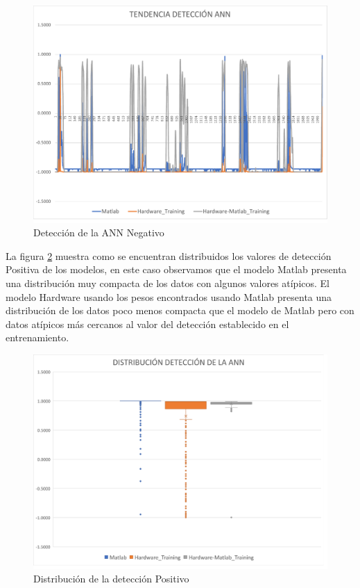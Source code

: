 \begin{figure}[H]
	\centering
		\includegraphics[scale=0.6]{./Figures/TendenciaANN2}
	\caption{Detección de la ANN Negativo}
	\label{fig:TendN}
\end{figure}

 La figura \ref{fig:DistP} muestra como se encuentran distribuidos los valores de detección Positiva de los modelos, en este caso observamos que el modelo Matlab presenta una distribución muy compacta de los datos con algunos valores atípicos. El modelo Hardware usando los pesos encontrados usando Matlab presenta una distribución de los datos poco menos compacta que el modelo de Matlab pero con datos atípicos más cercanos al valor del detección establecido en el entrenamiento.

\begin{figure}[H]
	\centering
		\includegraphics[scale=0.6]{./Figures/Distribucion1}
	\caption{Distribución de la detección Positivo}
	\label{fig:DistP}
\end{figure}

